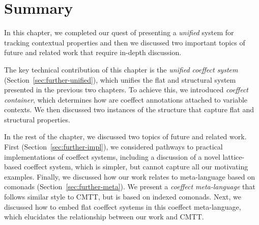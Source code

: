 %
%

\section{Summary}

In this chapter, we completed our quest of presenting a \emph{unified} system for tracking contextual
properties and then we discussed two important topics of future and related work that require
in-depth discussion.

The key technical contribution of this chapter is the \emph{unified coeffect system}
(Section~\ref{sec:further-unified}), which unifies the flat and structural system presented
in the previous two chapters. To achieve this, we introduced \emph{coeffect container}, which
determines how are coeffect annotations attached to variable contexts. We then discussed two
instances of the structure that capture flat and structural properties.

In the rest of the chapter, we discussed two topics of future and related work. First
(Section~\ref{sec:further-impl}), we considered pathways to practical implementations of
coeffect systems, including a discussion of a novel lattice-based coeffect system, which is simpler,
but cannot capture all our motivating examples. Finally, we discussed how our work relates to
meta-language based on comonads (Section~\ref{sec:further-meta}). We present a \emph{coeffect
meta-language} that follows similar style to CMTT, but is based on indexed comonads. Next, we
discussed how to embed flat coeffect systems in this coeffect meta-language, which elucidates the
relationship between our work and CMTT.
